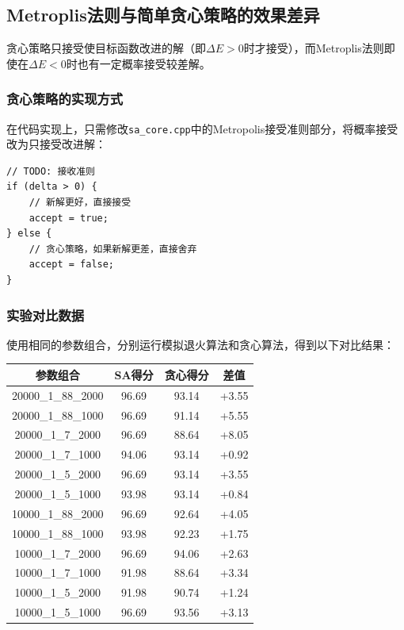 \documentclass[UTF8,12pt,a4paper]{ctexart}
\begin{document}
\subsection{Metroplis法则与简单贪心策略的效果差异}

贪心策略只接受使目标函数改进的解（即$\Delta E > 0$时才接受），而Metroplis法则即使在$\Delta E < 0$时也有一定概率接受较差解。

\subsubsection{贪心策略的实现方式}

在代码实现上，只需修改\texttt{sa\_core.cpp}中的Metropolis接受准则部分，将概率接受改为只接受改进解：
\begin{lstlisting}
// TODO: 接收准则
if (delta > 0) {
	// 新解更好，直接接受
	accept = true;
} else {
	// 贪心策略，如果新解更差，直接舍弃
	accept = false;
}
\end{lstlisting}

\subsubsection{实验对比数据}

使用相同的参数组合，分别运行模拟退火算法和贪心算法，得到以下对比结果：

\begin{center}
\begin{tabular}{|c|c|c|c|}
	\hline
	\textbf{参数组合} & \textbf{SA得分} & \textbf{贪心得分} & \textbf{差值} \\
	\hline
	20000\_1\_88\_2000 & 96.69 & 93.14 & +3.55 \\
	\hline
	20000\_1\_88\_1000 & 96.69 & 91.14 & +5.55 \\
	\hline
	20000\_1\_7\_2000 & 96.69 & 88.64 & +8.05 \\
	\hline
	20000\_1\_7\_1000 & 94.06 & 93.14 & +0.92 \\
	\hline
	20000\_1\_5\_2000 & 96.69 & 93.14 & +3.55 \\
	\hline
	20000\_1\_5\_1000 & 93.98 & 93.14 & +0.84 \\
	\hline
	10000\_1\_88\_2000 & 96.69 & 92.64 & +4.05 \\
	\hline
	10000\_1\_88\_1000 & 93.98 & 92.23 & +1.75 \\
	\hline
	10000\_1\_7\_2000 & 96.69 & 94.06 & +2.63 \\
	\hline
	10000\_1\_7\_1000 & 91.98 & 88.64 & +3.34 \\
	\hline
	10000\_1\_5\_2000 & 91.98 & 90.74 & +1.24 \\
	\hline
	10000\_1\_5\_1000 & 96.69 & 93.56 & +3.13 \\
	\hline
\end{tabular}
\end{center}
\end{document}
